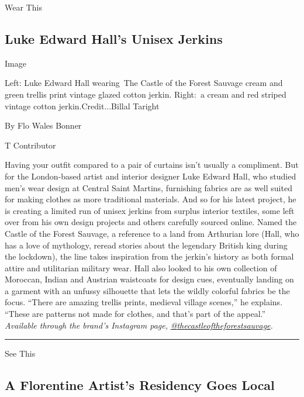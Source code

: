 Wear This

\hypertarget{luke-edward-halls-unisex-jerkins}{%
\subsection{Luke Edward Hall's Unisex
Jerkins}\label{luke-edward-halls-unisex-jerkins}}

Image

Left: Luke Edward Hall wearing~The Castle of the Forest Sauvage cream
and green trellis print vintage glazed cotton jerkin. Right:~a cream and
red striped vintage cotton jerkin.Credit...Billal Taright

By Flo Wales Bonner

T Contributor

Having your outfit compared to a pair of curtains isn't usually a
compliment. But for the London-based artist and interior designer Luke
Edward Hall, who studied men's wear design at Central Saint Martins,
furnishing fabrics are as well suited for making clothes as more
traditional materials. And so for his latest project, he is creating a
limited run of unisex jerkins from surplus interior textiles, some left
over from his own design projects and others carefully sourced online.
Named the Castle of the Forest Sauvage, a reference to a land from
Arthurian lore (Hall, who has a love of mythology, reread stories about
the legendary British king during the lockdown), the line takes
inspiration from the jerkin's history as both formal attire and
utilitarian military wear. Hall also looked to his own collection of
Moroccan, Indian and Austrian waistcoats for design cues, eventually
landing on a garment with an unfussy silhouette that lets the wildly
colorful fabrics be the focus. ``There are amazing trellis prints,
medieval village scenes,'' he explains. ``These are patterns not made
for clothes, and that's part of the appeal.'' \emph{Available through
the brand's Instagram page,}
\href{https://www.instagram.com/lukeedwardhall}{\emph{@}}\href{https://www.instagram.com/thecastleoftheforestsauvage/?hl=en}{\emph{thecastleoftheforestsauvage}}\emph{.}

\begin{center}\rule{0.5\linewidth}{\linethickness}\end{center}

See This

\hypertarget{a-florentine-artists-residency-goes-local}{%
\subsection{A Florentine Artist's Residency Goes
Local}\label{a-florentine-artists-residency-goes-local}}

